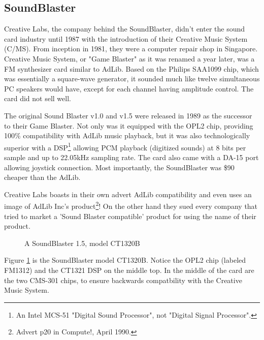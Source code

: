 \documentclass[book.tex]{subfiles}
\begin{document}
  \subsection{SoundBlaster}
  Creative Labs, the company behind the SoundBlaster, didn't enter the sound card industry until 1987 with the introduction of their Creative Music System (C/MS). From inception in 1981, they were a computer repair shop in Singapore. Creative Music System, or "Game Blaster" as it was renamed a year later, was a FM synthesizer card similar to AdLib. Based on the Philips SAA1099 chip, which was essentially a square-wave generator, it sounded much like twelve simultaneous PC speakers would have, except for each channel having amplitude control. The card did not sell well.\\
  
  \par
The original Sound Blaster v1.0 and v1.5 were released in 1989 as the successor to their Game Blaster. Not only was it equipped with the OPL2 chip, providing 100\% compatibility with AdLib music playback, but it was also technologically superior with a DSP\footnote{An Intel MCS-51 "Digital Sound Processor", not "Digital Signal Processor".} allowing PCM playback (digitized sounds) at 8 bits per sample and up to 22.05kHz sampling rate. The card also came with a DA-15 port allowing joystick connection. Most importantly, the SoundBlaster was \$90 cheaper than the AdLib.\\

\par
Creative Labs boasts in their own advert AdLib compatibility and even uses an image of AdLib Inc's product\footnote{Advert p20 in Compute!, April 1990.}! On the other hand they sued every company that tried to market a 'Sound Blaster compatible' product for using the name of their product.\\

\begin{figure}[H] 
  \centering 
  \caption{A SoundBlaster 1.5, model CT1320B }
  \label{asb15}
\end{figure}

\par
Figure \ref{asb15} is the SoundBlaster model CT1320B. Notice the OPL2 chip (labeled FM1312) and the CT1321 DSP on the middle top. In the middle of the card are the two CMS-301 chips, to ensure backwards compatbility with the Creative Music System.\\
\end{document}
